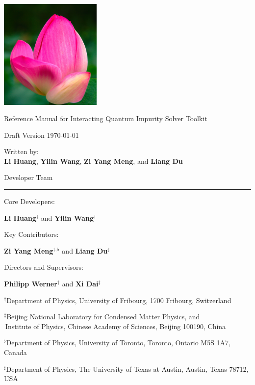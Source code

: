 {
\pagestyle{plain}
\parindent 0pt
\vbox{}

\includegraphics[width=5cm]{figure/cover.png}

\Huge{\textsf{Reference Manual for {\color{red}I}nteracting {\color{cyan}Q}uantum {\color{cyan}I}mpurity {\color{cyan}S}olver {\color{cyan}T}oolkit}}

\Large{\textsf{Draft Version \today}}

\Large{\textsf{Written by}:\\ \textbf{Li Huang}, \textbf{Yilin Wang}, \textbf{Zi Yang Meng}, and \textbf{Liang Du}}

\vbox{}
\clearpage

\huge{{\iqist} Developer Team}

\vspace{-1cm}
\rule{\textwidth}{1pt}

\Large{Core Developers:}

\Large{\textbf{Li Huang}$^{\dagger}$ and \textbf{Yilin Wang}$^{\ddagger}$}

\Large{Key Contributors:}

\Large{\textbf{Zi Yang Meng}$^{\ddagger, \flat}$ and \textbf{Liang Du}$^{\sharp}$}

\Large{Directors and Supervisors:}

\Large{\textbf{Philipp Werner}$^{\dagger}$ and \textbf{Xi Dai}$^{\ddagger}$}

\vskip 1.0cm
$^{\dagger}$\large{\textsf{Department of Physics, University of Fribourg, 1700 Fribourg, Switzerland}}

$^{\ddagger}$\large{\textsf{Beijing National Laboratory for Condensed Matter Physics, and \\ 
$^{\ }$Institute of Physics, Chinese Academy of Sciences, Beijing 100190, China}}

$^{\flat}$\large{\textsf{Department of Physics, University of Toronto, Toronto, Ontario M5S 1A7, Canada}}

$^{\sharp}$\large{\textsf{Department of Physics, The University of Texas at Austin, Austin, Texas 78712, USA}}

\vbox{}         
\clearpage
}


